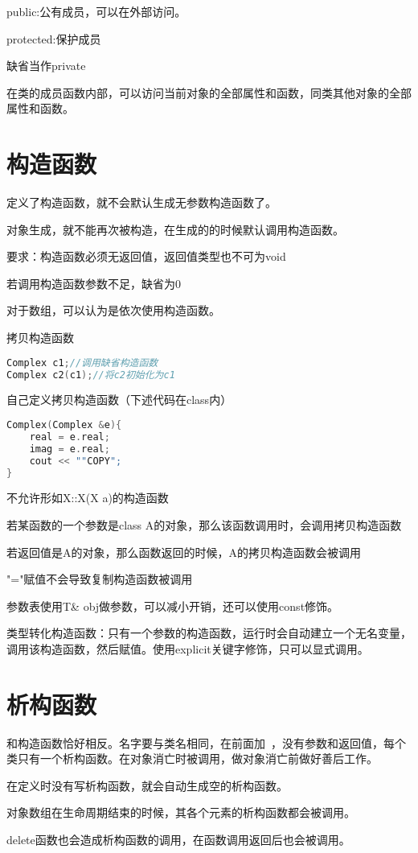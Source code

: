 \documentclass[UTF8]{ctexart}
\begin{document}
public:公有成员，可以在外部访问。

protected:保护成员

缺省当作private

在类的成员函数内部，可以访问当前对象的全部属性和函数，同类其他对象的全部属性和函数。

\section{构造函数}定义了构造函数，就不会默认生成无参数构造函数了。

对象生成，就不能再次被构造，在生成的的时候默认调用构造函数。

要求：构造函数必须无返回值，返回值类型也不可为void

若调用构造函数参数不足，缺省为0

对于数组，可以认为是依次使用构造函数。

拷贝构造函数
\begin{lstlisting}[language=C++]
Complex c1;//调用缺省构造函数
Complex c2(c1);//将c2初始化为c1
\end{lstlisting}

自己定义拷贝构造函数（下述代码在class内）
\begin{lstlisting}[language=C++]
Complex(Complex &e){
	real = e.real;
	imag = e.real;
	cout << ""COPY";
}
\end{lstlisting}

不允许形如X::X(X a)的构造函数

若某函数的一个参数是class A的对象，那么该函数调用时，会调用拷贝构造函数

若返回值是A的对象，那么函数返回的时候，A的拷贝构造函数会被调用

"="赋值不会导致复制构造函数被调用

参数表使用T& obj做参数，可以减小开销，还可以使用const修饰。

类型转化构造函数：只有一个参数的构造函数，运行时会自动建立一个无名变量，调用该构造函数，然后赋值。使用explicit关键字修饰，只可以显式调用。

\section{析构函数}和构造函数恰好相反。名字要与类名相同，在前面加~，没有参数和返回值，每个类只有一个析构函数。在对象消亡时被调用，做对象消亡前做好善后工作。

在定义时没有写析构函数，就会自动生成空的析构函数。

对象数组在生命周期结束的时候，其各个元素的析构函数都会被调用。

delete函数也会造成析构函数的调用，在函数调用返回后也会被调用。
\end{document}
